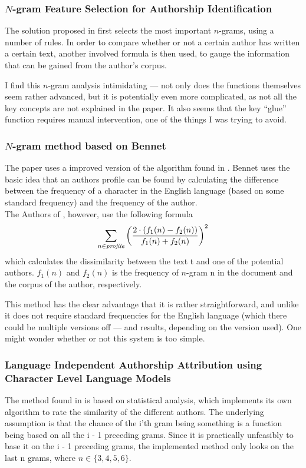 \subsubsection*{$N$-gram Feature Selection for Authorship Identification}
The solution proposed in \cite{nr3} first selects the most important $n$-grams, using a number of rules. In order to compare whether or not a certain author has written a certain text, another involved formula is then used, to gauge the information that can be gained from the author's corpus.

I find this $n$-gram analysis intimidating --- not only does the functions themselves seem rather advanced, but it is potentially even more complicated, as not all the key concepts are not explained in the paper. It also seems that the key ``glue'' function requires manual intervention, one of the things I was trying to avoid. 

\subsubsection*{$N$-gram method based on Bennet}
The paper \cite{nr2} uses a improved version of the algorithm found in \cite{Bennet}. Bennet uses the basic idea that an authors profile can be found by calculating the difference between the frequency of a character in the English language (based on some standard frequency) and the frequency of the author.\\

The Authors of \cite{nr2}, however, use the following formula
$$
\sum_{n \in \rm{\emph{profile}}}\left(\frac{2 \cdot (f_1(n) - f_2(n))}{f_1(n) + f_2(n)}\right)^2
$$
which calculates the dissimilarity between the text t and one of the potential authors. $f_1(n)$ and $f_2(n)$ is the frequency of $n$-gram n in the document and the corpus of the author, respectively. 

This method has the clear advantage that it is rather straightforward, and unlike \cite{Bennet} it does not require standard frequencies for the English language (which there could be multiple versions off --- and results, depending on the version used). One might wonder whether or not this system is too simple.

\subsubsection*{Language Independent Authorship Attribution using Character Level Language Models}
The method found in \cite{nr4} is  based on statistical analysis, which implements its own algorithm to rate the similarity of the different authors. The underlying assumption is that the chance of the i'th gram being something is a function being based on all the i - 1 preceding grams. Since it is practically unfeasibly to base it on the i - 1 preceding grams, the implemented method only looks on the last n grams, where $n \in \{3,4,5,6 \}$. 


